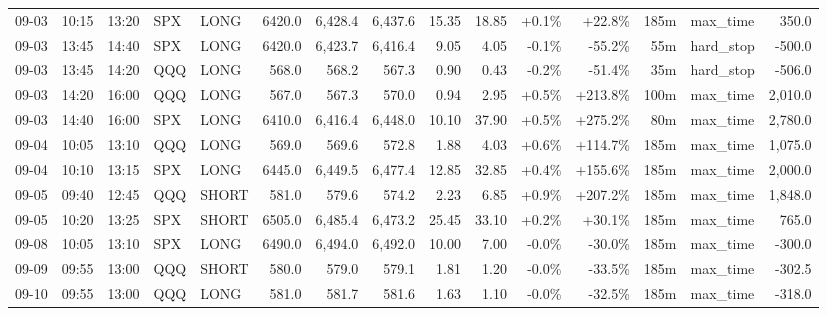\documentclass[11pt,a4paper,twoside]{article}
\begin{document}
\begin{landscape}
\begin{center}
\begin{longtable}{>{\color{txtmain}}l l l l l r r r r r r r r >{\color{txtmain}}l r}
09-03 & 10:15 & 13:20 & SPX & LONG & 6420.0 & 6,428.4 & 6,437.6 & 15.35 & 18.85 & \textcolor{wingreen}{+0.1\%} & \textcolor{wingreen}{+22.8\%} & 185m & max\_time & \textcolor{wingreen}{350.0} \\
09-03 & 13:45 & 14:40 & SPX & LONG & 6420.0 & 6,423.7 & 6,416.4 & 9.05 & 4.05 & \textcolor{lossred}{-0.1\%} & \textcolor{lossred}{-55.2\%} & 55m & hard\_stop & \textcolor{lossred}{-500.0} \\
09-03 & 13:45 & 14:20 & QQQ & LONG & 568.0 & 568.2 & 567.3 & 0.90 & 0.43 & \textcolor{lossred}{-0.2\%} & \textcolor{lossred}{-51.4\%} & 35m & hard\_stop & \textcolor{lossred}{-506.0} \\
09-03 & 14:20 & 16:00 & QQQ & LONG & 567.0 & 567.3 & 570.0 & 0.94 & 2.95 & \textcolor{wingreen}{+0.5\%} & \textcolor{wingreen}{+213.8\%} & 100m & max\_time & \textcolor{wingreen}{2,010.0} \\
09-03 & 14:40 & 16:00 & SPX & LONG & 6410.0 & 6,416.4 & 6,448.0 & 10.10 & 37.90 & \textcolor{wingreen}{+0.5\%} & \textcolor{wingreen}{+275.2\%} & 80m & max\_time & \textcolor{wingreen}{2,780.0} \\
09-04 & 10:05 & 13:10 & QQQ & LONG & 569.0 & 569.6 & 572.8 & 1.88 & 4.03 & \textcolor{wingreen}{+0.6\%} & \textcolor{wingreen}{+114.7\%} & 185m & max\_time & \textcolor{wingreen}{1,075.0} \\
09-04 & 10:10 & 13:15 & SPX & LONG & 6445.0 & 6,449.5 & 6,477.4 & 12.85 & 32.85 & \textcolor{wingreen}{+0.4\%} & \textcolor{wingreen}{+155.6\%} & 185m & max\_time & \textcolor{wingreen}{2,000.0} \\
09-05 & 09:40 & 12:45 & QQQ & SHORT & 581.0 & 579.6 & 574.2 & 2.23 & 6.85 & \textcolor{wingreen}{+0.9\%} & \textcolor{wingreen}{+207.2\%} & 185m & max\_time & \textcolor{wingreen}{1,848.0} \\
09-05 & 10:20 & 13:25 & SPX & SHORT & 6505.0 & 6,485.4 & 6,473.2 & 25.45 & 33.10 & \textcolor{wingreen}{+0.2\%} & \textcolor{wingreen}{+30.1\%} & 185m & max\_time & \textcolor{wingreen}{765.0} \\
09-08 & 10:05 & 13:10 & SPX & LONG & 6490.0 & 6,494.0 & 6,492.0 & 10.00 & 7.00 & \textcolor{lossred}{-0.0\%} & \textcolor{lossred}{-30.0\%} & 185m & max\_time & \textcolor{lossred}{-300.0} \\
09-09 & 09:55 & 13:00 & QQQ & SHORT & 580.0 & 579.0 & 579.1 & 1.81 & 1.20 & \textcolor{lossred}{-0.0\%} & \textcolor{lossred}{-33.5\%} & 185m & max\_time & \textcolor{lossred}{-302.5} \\
09-10 & 09:55 & 13:00 & QQQ & LONG & 581.0 & 581.7 & 581.6 & 1.63 & 1.10 & \textcolor{lossred}{-0.0\%} & \textcolor{lossred}{-32.5\%} & 185m & max\_time & \textcolor{lossred}{-318.0} \\

\end{longtable}
\end{center}
\end{landscape}
\end{document}
